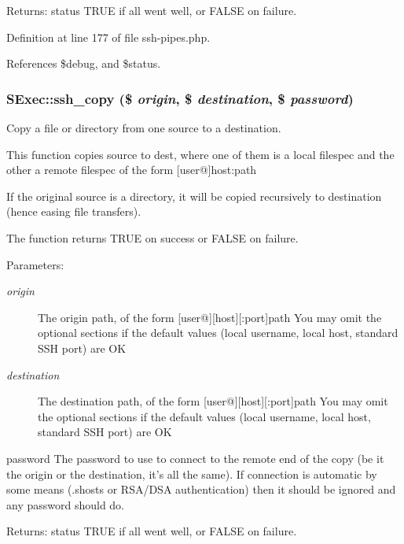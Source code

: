 \begin{Desc}
\item[Returns:]status TRUE if all went well, or FALSE on failure. \end{Desc}


Definition at line 177 of file ssh-pipes.php.

References \$debug, and \$status.
\subsubsection{\setlength{\rightskip}{0pt plus 5cm}SExec::ssh\_\-copy (\$ {\em origin}, \$ {\em destination}, \$ {\em password})}\label{classSExec_a4}


Copy a file or directory from one source to a destination. 

This function copies source to dest, where one of them is a local filespec and the other a remote filespec of the form [user@]host:path

If the original source is a directory, it will be copied recursively to destination (hence easing file transfers).

The function returns TRUE on success or FALSE on failure.

\begin{Desc}
\item[Parameters:]
\begin{description}
\item[{\em origin}]The origin path, of the form [user@][host][:port]path You may omit the optional sections if the default values (local username, local host, standard SSH port) are OK\item[{\em destination}]The destination path, of the form [user@][host][:port]path You may omit the optional sections if the default values (local username, local host, standard SSH port) are OK\end{description}
\end{Desc}
password The password to use to connect to the remote end of the copy (be it the origin or the destination, it's all the same). If connection is automatic by some means (.shosts or RSA/DSA authentication) then it should be ignored and any password should do.

\begin{Desc}
\item[Returns:]status TRUE if all went well, or FALSE on failure. \end{Desc}


